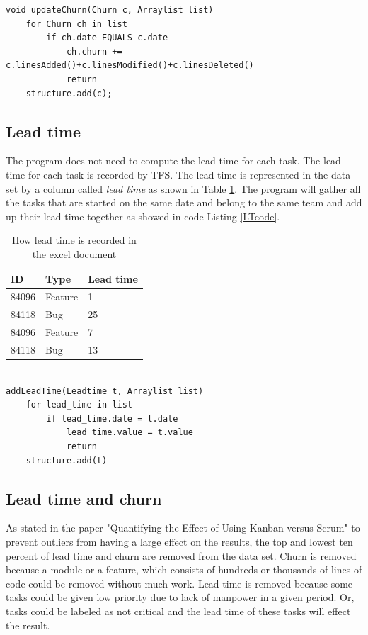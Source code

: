 \documentclass[UKenglish]{ifimaster}  %
\begin{document}
\begin{minipage}{\textwidth}
\begin{lstlisting}[caption=Pseudocode example of how throughput is measured, label=churnCode]
void updateChurn(Churn c, Arraylist list)
	for Churn ch in list
		if ch.date EQUALS c.date
			ch.churn += c.linesAdded()+c.linesModified()+c.linesDeleted()
			return
	structure.add(c);
\end{lstlisting}
 \end{minipage}
 


\subsection{Lead time}
\label{sec:LT}
The program does not need to compute  the lead time for each task. The lead time for each task is recorded by TFS. The lead time is represented in the data set by a column called \textit{lead time} as shown in Table \ref{table:LT}. The program will gather all the tasks that are started on the same date and belong to the same team and add up their lead time together as showed in code Listing \ref{LTcode}.   
\begin{table}[!ht]
\begin{center}
\begin{tabular}{ | l | l | l | }
\hline
	\bf{ID} & \bf{Type} & \bf{Lead time} \\ \hline
	84096 &  Feature  & 1 \\ \hline
	84118 &  Bug  & 25 \\ \hline
	84096 &  Feature  & 7 \\ \hline
	84118 &  Bug  & 13 \\ \hline
\end{tabular}
\caption{How lead time is recorded in the excel document}
\label{table:LT} %
\end{center}
\end{table}

\begin{minipage}{\textwidth}
\begin{lstlisting}[caption=Pseudocode example of lead time is measured, label=LTcode]

addLeadTime(Leadtime t, Arraylist list)
	for lead_time in list
		if lead_time.date = t.date
			lead_time.value = t.value
			return
	structure.add(t)
\end{lstlisting}
\end{minipage}
\subsection{Lead time and churn}
As stated in the paper "Quantifying the Effect of Using Kanban versus Scrum" \parencite{Dag} to prevent outliers from having a large effect on the results, the top and lowest ten percent of lead time and churn are removed from the data set.
Churn is removed because a module or a feature, which consists of hundreds or thousands of lines of code could be removed without much work. Lead time is removed because some tasks could be given low priority due to lack of manpower in a given period. Or, tasks could be labeled as not critical and the lead time of these tasks will effect the result.
\end{document}
